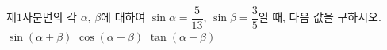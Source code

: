 제$1$사분면의 각 $\alpha$, $\beta$에 대하여 $\sin\alpha=\dfrac{5}{13}$, $\sin\beta=\dfrac{3}{5}$일 때, 다음 값을 구하시오.
 $\sin(\alpha+\beta)$
 $\cos(\alpha-\beta)$
 $\tan(\alpha-\beta)$
